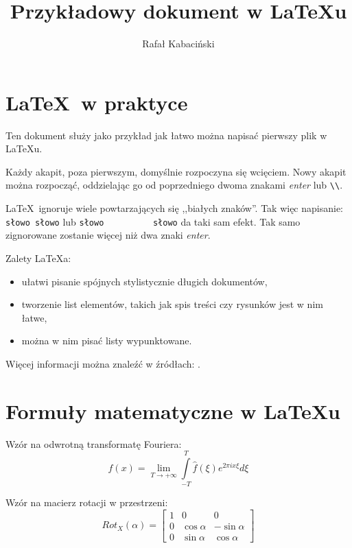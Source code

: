 \documentclass[10pt,a4paper]{article}
\title{Przykładowy dokument w \LaTeX u}
\author{Rafał Kabaciński}
\begin{document}
	
	\maketitle
	
	\tableofcontents
	
	\section{\LaTeX\ w praktyce}
	Ten dokument służy jako przykład jak łatwo można napisać pierwszy plik w \LaTeX u. 
	
	Każdy akapit, poza pierwszym, domyślnie rozpoczyna się wcięciem.
	Nowy akapit można rozpocząć, oddzielając go od poprzedniego dwoma znakami \emph{enter} lub \verb|\\|.
	
	
	
	\LaTeX\ ignoruje        wiele powtarzających się ,,białych znaków''. Tak więc napisanie: \verb|słowo słowo| lub \verb|słowo          słowo| da taki sam efekt. Tak samo zignorowane zostanie więcej niż dwa znaki \emph{enter}.
	
	Zalety \LaTeX a:
	\begin{itemize}
		\item ułatwi pisanie spójnych stylistycznie długich dokumentów,
		\item tworzenie list elementów, takich jak spis treści czy rysunków jest w nim łatwe,
		\item można w nim pisać listy wypunktowane.
	\end{itemize}

	Więcej informacji można znaleźć w źródłach: \cite{lshort2e,lshort2ePL,WikiBook,overleaf}.
	
	\section{Formuły matematyczne w \LaTeX u}
	
	Wzór na odwrotną transformatę Fouriera:
	\begin{equation}
		f(x) = \lim \limits_{T\rightarrow + \infty} \int \limits_{-T}^{T} \hat f (\xi) e^{2\pi i x \xi} d\xi
	\end{equation}
	
	Wzór na macierz rotacji w przestrzeni:
	$$
	Rot_X(\alpha) = \left[
	\begin{array}{ccc}
	1 & 0 & 0 \\
	0 & \cos \alpha & -\sin \alpha \\
	0 & \sin \alpha & \cos \alpha 
	\end{array}\right]
	$$
	
\end{document}
